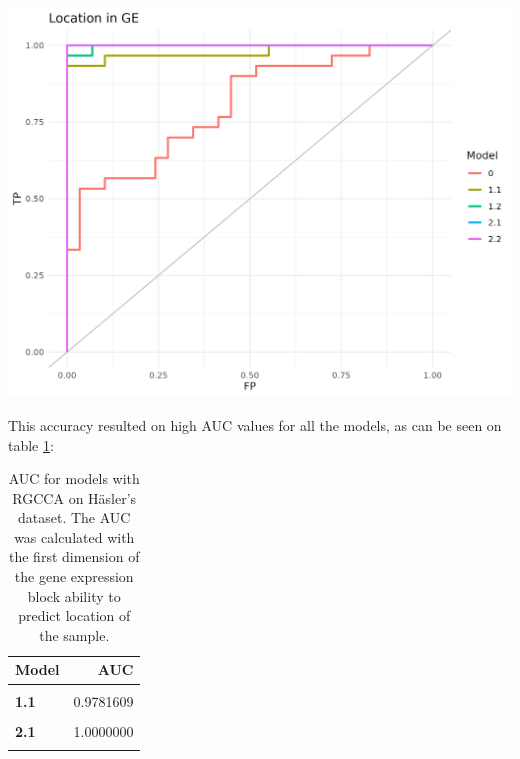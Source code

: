 \documentclass[
  a4paper,
]{book}
\let\origfigure\figure
\let\endorigfigure\endfigure
\renewenvironment{figure}[1][2] {
    \expandafter\origfigure\expandafter[!ht]
} {
    \endorigfigure
}
\begin{document}
\begin{figure}
\includegraphics[width=1\linewidth]{images/hasler-auc} \caption[AUC for models with RGCCA on Häsler's dataset]{AUC for models with RGCCA on Häsler's dataset. The AUC was calculated with the first dimension of the gene expression block ability to predict location of the sample.}\label{fig:hasler-auc-plot}
\end{figure}

This accuracy resulted on high AUC values for all the models, as can be seen on table \ref{tab:hasler-auc}:

\begin{table}[H]

\caption[AUC for models with RGCCA on Häsler's dataset]{\label{tab:hasler-auc}AUC for models with RGCCA on Häsler's dataset. The AUC was calculated with the first dimension of the gene expression block ability to predict location of the sample.}
\centering
\begin{tabular}[t]{|>{}l|>{}r|}
\hline
\textbf{Model} & \textbf{AUC}\\
\hline
\textbf{\cellcolor{gray!6}{0}} & \cellcolor{gray!6}{0.8011494}\\
\hline
\textbf{1.1} & 0.9781609\\
\hline
\textbf{\cellcolor{gray!6}{1.2}} & \cellcolor{gray!6}{0.9977011}\\
\hline
\textbf{2.1} & 1.0000000\\
\hline
\textbf{\cellcolor{gray!6}{2.2}} & \cellcolor{gray!6}{1.0000000}\\
\hline
\end{tabular}
\end{table}
\end{document}
